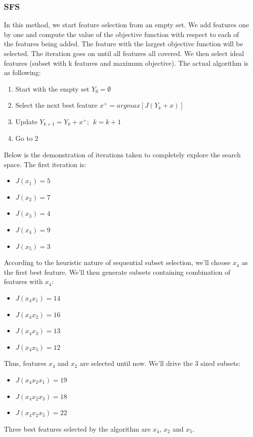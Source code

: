 \documentclass[12pt]{article}
\numberwithin{equation}{section}
\numberwithin{table}{section}
\numberwithin{figure}{section}
\begin{document}
\subsubsection*{SFS}
In this method, we start feature selection from an empty set. We add features one by one and compute the value of the objective function with respect to each of the features being added. The feature with the largest objective function will be selected. The iteration goes on until all features all covered. We then select ideal features (subset with k features and maximum objective). The actual algorithm is as following:
\begin{enumerate}
	\item Start with the empty set $ Y_0 = \emptyset$
	\item Select the next best feature $ x^+ = argmax[J(Y_k + x)]$
	\item Update $Y_{k + 1} = Y_k + x^+;\ \ k = k + 1$
	\item Go to 2
\end{enumerate}
Below is the demonstration of iterations taken to completely explore the search space. The first iteration is:
\begin{itemize}
	\item $J(x_1) = 5$
	\item $J(x_2) = 7$
	\item $J(x_3) = 4$
	\item $J(x_4) = 9$
	\item $J(x_5) = 3$
\end{itemize}
According to the heuristic nature of sequential subset selection, we'll choose $x_4$ as the first best feature. We'll then generate subsets containing combination of features with $x_4$:
\begin{itemize}
	\item $J(x_4x_1) = 14$
	\item $J(x_4x_2) = 16$
	\item $J(x_4x_3) = 13$
	\item $J(x_4x_5) = 12$
\end{itemize}
Thus, features $x_4$ and $x_2$ are selected until now. We'll drive the 3 sized subsets:
\begin{itemize}
	\item $J(x_4x_2x_1) = 19$
	\item $J(x_4x_2x_3) = 18$
	\item $J(x_4x_2x_5) = 22$
\end{itemize}
Three best features selected by the algorithm are $x_4$, $x_2$ and $x_5$.
\end{document}
